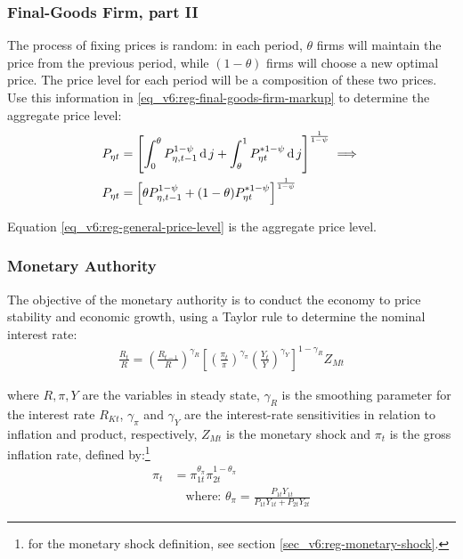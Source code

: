 \documentclass[../thesis.tex]{subfiles}
\begin{document}
\subsubsection*{Final-Goods Firm, part II}

The process of fixing prices is random: in each period, $\theta$ firms will maintain the price from the previous period, while $(1-\theta)$ firms will choose a new optimal price. The price level for each period will be a composition of these two prices. Use this information in \ref{eq_v6:reg-final-goods-firm-markup} to determine the aggregate price level:
\begin{align}
	P_{\eta t} & = \left[ \int_{0}^{\theta} P_{\eta, t-1}^{1-\psi} \operatorname{d} j + \int_{\theta}^{1} P_{\eta t}^{\ast 1-\psi} \operatorname{d} j \right]^{\frac{1}{1-\psi}}  \implies \nonumber \\
	P_{\eta t} & = \left[ \theta P_{\eta, t-1}^{1-\psi} + (1-\theta) P_{\eta t}^{\ast 1-\psi} \right]^\frac{1}{1-\psi} \label{eq_v6:reg-general-price-level}
\end{align}

Equation \ref{eq_v6:reg-general-price-level} is the aggregate price level.


\subsubsection{Monetary Authority}

The objective of the monetary authority is to conduct the economy to price stability and economic growth, using a Taylor rule \cite{taylor_discretion_1993} to determine the nominal interest rate:
\begin{align}
	\label{eq_v6:reg-monetary-policy}
	\frac{R_{t}}{R} =
	\left( \frac{R_{t-1}}{R} \right)^{\gamma_{R}}  \left[
	\left( \frac{\pi_t}{\pi} \right)^{\gamma_{\pi}}
	\left( \frac{Y_{t}}{Y} \right)^{\gamma_{Y}} \right]^{1-\gamma_{R}} Z_{Mt}
\end{align}

where $R, \pi, Y$ are the variables in steady state, $\gamma_{R}$ is the smoothing parameter for the interest rate $R_{Kt}$, $\gamma_{\pi}$ and $\gamma_{Y}$ are the interest-rate sensitivities in relation to inflation and product, respectively, $Z_{Mt}$ is the monetary shock and $\pi_t$ is the gross inflation rate, defined by:\footnote{for the monetary shock definition, see section \ref{sec_v6:reg-monetary-shock}.}
\begin{align}
	\pi_{t} &= \pi_{1t}^{\theta_{\pi}} \pi_{2t}^{1 - \theta_{\pi}}
	\label{eq_v6:reg-gross-inflation-rate} \\
	&\quad \text{where: } \theta_{\pi} = \frac{P_{1t} Y_{1t}}{P_{1t} Y_{1t} + P_{2t} Y_{2t}} \label{eq_v6:reg-theta-pi}
\end{align}
\end{document}
